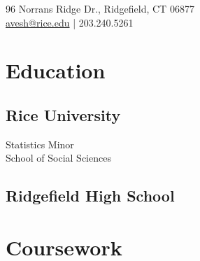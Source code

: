 \documentclass[]{ajk-resume}
\begin{document}
%
%
\lastupdated

%
%


{ 96 Norrans Ridge Dr., Ridgefield, CT 06877 \\
\href{mailto:avesh@rice.edu}{avesh@rice.edu} | 203.240.5261
}

%
%

\begin{minipage}[t]{0.33\textwidth} 


\section{Education} 

\subsection{Rice University}

Statistics Minor \\
School of Social Sciences \\
\sectionsep

\subsection{Ridgefield High School}
\sectionsep



\section{Coursework}

\end{minipage}
\end{document}
